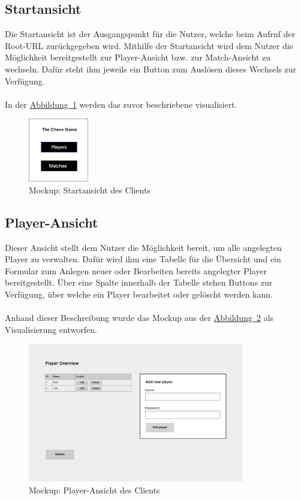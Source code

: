 \subsection{Startansicht}\label{sec:startView}
Die Startansicht ist der Ausgangspunkt für die Nutzer, welche beim Aufruf der Root-\gls{URL} zurückgegeben wird. Mithilfe der Startansicht wird dem Nutzer die Möglichkeit bereitgestellt zur Player-Ansicht bzw. zur Match-Ansicht zu wechseln. Dafür steht ihm jeweils ein Button zum Auslösen dieses Wechsels zur Verfügung.\\
\\
In der \hyperref[fig:startView]{Abbildung~\ref{fig:startView}} werden das zuvor beschriebene visualisiert.\\
\begin{figure}[htb]
	\includegraphics[width=0.234\textwidth]{images/start-view.png}
	\caption{Mockup: Startansicht des Clients}
	\label{fig:startView}
\end{figure}

\subsection{Player-Ansicht}\label{sec:playerView}
Dieser Ansicht stellt dem Nutzer die Möglichkeit bereit, um alle angelegten Player zu verwalten. Dafür wird ihm eine Tabelle für die Übersicht und ein Formular zum Anlegen neuer oder Bearbeiten bereits angelegter Player bereitgestellt. Über eine Spalte innerhalb der Tabelle stehen Buttons zur Verfügung, über welche ein Player bearbeitet oder gelöscht werden kann.\\
\\
Anhand dieser Beschreibung wurde das Mockup aus der \hyperref[fig:playerView]{Abbildung~\ref{fig:playerView}} als Visualisierung entworfen.
\begin{figure}[htb]
	\includegraphics[width=0.84\textwidth]{images/player-view.png}
	\caption{Mockup: Player-Ansicht des Clients}
	\label{fig:playerView}
\end{figure}

